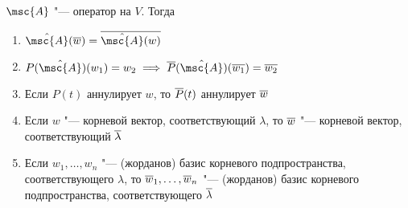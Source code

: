 \begin{lemma}
	$ \msc{A} $ "--- оператор на $ V $. Тогда
	\begin{enumerate}
		\item $ \hat{\msc{A}}(\ol{w}) = \ol{\hat{\msc{A}}(w)} $

		\item $ P(\hat{\msc{A}})(w_1) = w_2 \implies \ol{P}(\hat{\msc{A}})(\ol{w_1}) = \ol{w_2} $

		\item Если $ P(t) $ аннулирует $ w $, то $ \overline{P}(t) $ аннулирует $ \overline{w} $

		\item Если $ w $ "--- корневой вектор, соответствующий $ \lambda $, то $ \overline{w} $ "--- корневой вектор, соответствующий $ \overline{\lambda} $

		\item Если $ w_1, \dots, w_n $ "--- (жорданов) базис корневого подпространства, соответствующего $ \lambda $, то $ \overline{w}_1, \dots, \\
		\overline{w}_n $ "--- (жорданов) базис корневого подпространства, соответствующего $ \overline{\lambda} $ 
	\end{enumerate}
\end{lemma}

